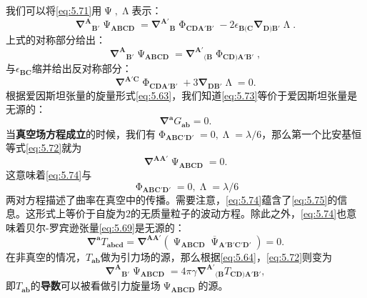 我们可以将\ref{eq:5.71}用$\upPsi ,\upLambda $表示：
\begin{equation*}
	\boldsymbol{\nabla }^{\boldsymbol{A}}{}_{\boldsymbol{B} '} \upPsi _{\boldsymbol{ABCD}} =\boldsymbol{\nabla }^{\boldsymbol{A} '}{}_{\boldsymbol{B}} \upPhi _{\boldsymbol{CDA} '\boldsymbol{B} '} -2\epsilon _{\boldsymbol{B}(\boldsymbol{C}}\boldsymbol{\nabla }_{\boldsymbol{D})\boldsymbol{B} '} \upLambda .
\end{equation*}
上式的对称部分给出：
\begin{equation}
	\boldsymbol{\nabla }^{\boldsymbol{A}}{}_{\boldsymbol{B} '} \upPsi _{\boldsymbol{ABCD}} =\boldsymbol{\nabla }^{\boldsymbol{A} '}{}_{(\boldsymbol{B}} \upPhi _{\boldsymbol{CD})\boldsymbol{A} '\boldsymbol{B} '} ,
	\label{eq:5.72}
\end{equation}
与$\epsilon _{\boldsymbol{BC}}$缩并给出反对称部分：
\begin{equation}
	\boldsymbol{\nabla }^{\boldsymbol{A} '\boldsymbol{C}} \upPhi _{\boldsymbol{CDA} '\boldsymbol{B} '} +3\boldsymbol{\nabla }_{\boldsymbol{DB} '} \upLambda =0.
	\label{eq:5.73}
\end{equation}
根据爱因斯坦张量的旋量形式\ref{eq:5.63}，我们知道\ref{eq:5.73}等价于爱因斯坦张量是无源的：
\begin{equation*}
	\boldsymbol{\nabla }^{\boldsymbol{a}} G_{\boldsymbol{ab}} =0.
\end{equation*}
当\textbf{真空场方程成立}的时候，我们有$\upPhi _{\boldsymbol{ABC} '\boldsymbol{D} '} =0,\upLambda =\lambda /6$，那么第一个比安基恒等式\ref{eq:5.72}就为
\begin{equation}
	\boldsymbol{\nabla }^{\boldsymbol{AA} '} \upPsi _{\boldsymbol{ABCD}} =0.
	\label{eq:5.74}
\end{equation}
这意味着\ref{eq:5.74}与
\begin{equation}
	\upPhi _{\boldsymbol{ABC} '\boldsymbol{D} '} =0,\upLambda =\lambda /6
	\label{eq:5.75}
\end{equation}
两对方程描述了曲率在真空中的传播。需要注意，\ref{eq:5.74}蕴含了\ref{eq:5.75}的信息。这形式上等价于自旋为$2$的无质量粒子的波动方程。除此之外，\ref{eq:5.74}也意味着贝尔-罗宾逊张量\ref{eq:5.69}是无源的：
\begin{equation*}
	\boldsymbol{\nabla }^{\boldsymbol{a}} T_{\boldsymbol{abcd}} =\boldsymbol{\nabla }^{\boldsymbol{AA} '} (\upPsi _{\boldsymbol{ABCD}}\overline{\upPsi }_{\boldsymbol{A'B'C'D} '} )=0.
\end{equation*}
在非真空的情况，$T_{\boldsymbol{ab}}$做为引力场的源，那么根据\ref{eq:5.64}，\ref{eq:5.72}则变为
\begin{equation*}
	\boldsymbol{\nabla }^{\boldsymbol{A}}{}_{\boldsymbol{B} '} \upPsi _{\boldsymbol{ABCD}} =4\pi \gamma \boldsymbol{\nabla }^{\boldsymbol{A} '}{}_{(\boldsymbol{B}} T_{\boldsymbol{CD})\boldsymbol{A} '\boldsymbol{B} '} ,
\end{equation*}
即$T_{\boldsymbol{ab}}$的\textbf{导数}可以被看做引力旋量场$\upPsi _{\boldsymbol{ABCD}}$的源。

